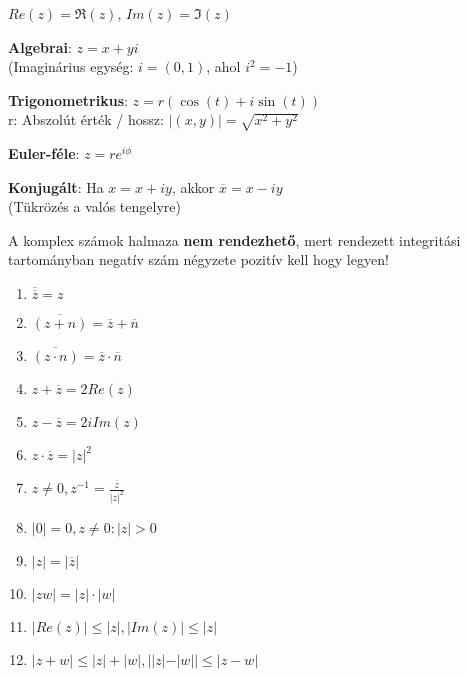 \begin{frame}
\begin{tcolorbox}[title={Alakok}]
$Re(z) = {\Re}(z)$, $Im(z) = {\Im}(z)$\\
\mmedskip

\textbf{Algebrai}: $z = x + yi$\\
(Imaginárius egység: $i = (0, 1)$, ahol $i^2 = -1$)\\
\mmedskip

\textbf{Trigonometrikus}: $z = r({\cos}(t) + i{\sin}(t))$\\
r: Abszolút érték / hossz: $|(x, y)| = \sqrt{x^2 + y^2}$\\
\mmedskip

\textbf{Euler-féle}: $z = re^{i{\phi}}$\\
\mmedskip

\textbf{Konjugált}: Ha $x = x + iy$, akkor $\overline{x} = x - iy$\\
(Tükrözés a valós tengelyre)\\
\mmedskip

A komplex számok halmaza \textbf{nem rendezhető}, mert rendezett integritási tartományban negatív szám négyzete pozitív kell hogy legyen!
\end{tcolorbox}

\begin{tcolorbox}[title={Ész}]
\begin{enumerate}
\item $\overline{\overline{z}} = z$
\item $\overline{(z + n)} = \overline{z} + \overline{n}$
\item $\overline{(z \cdot n)} = \overline{z} \cdot \overline{n}$
\item $z + \overline{z} = 2Re(z)$
\item $z - \overline{z} = 2iIm(z)$
\item $z \cdot \overline{z} = |z|^2$
\item $z \neq 0, z^{-1} = \frac{\overline{z}}{|z|^2}$
\item $|0| = 0, z \neq 0 : |z| > 0$
\item $|z| = |\overline{z}|$
\item $|zw| = |z| \cdot |w|$
\item $|Re(z)| \leq |z|, |Im(z)| \leq |z|$
\item $|z + w| \leq |z| + |w|, ||z| - |w|| \leq |z - w|$
\end{enumerate}
\end{tcolorbox}
\end{frame}


